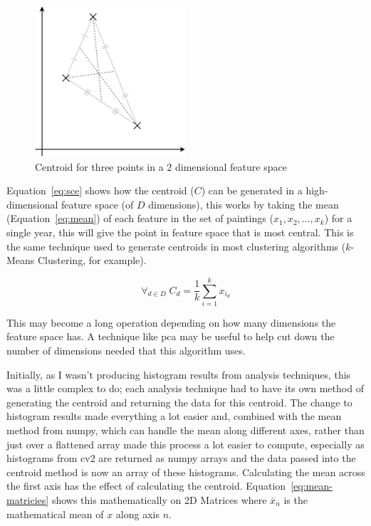 \begin{figure}[h]
\centering
\includegraphics[width=0.5\textwidth]{img/centroid.pdf}
\caption{Centroid for three points in a 2 dimensional feature space}\label{fig:centroid}
\end{figure}

Equation~\ref{eq:sce} shows how the centroid ($C$) can be generated in a high-dimensional feature 
space (of $D$ dimensions), this works by taking the mean (Equation~\ref{eq:mean}) of each feature 
in the set of paintings ($x_1, x_2,\dotsc,x_k$) for a single year, this will give the point in 
feature space that is most central. This is the same technique used to generate centroids in most 
clustering algorithms ($k$-Means Clustering, for example).

\begin{equation}
\label{eq:sce}
\forall_{d \in D}\;C_d = \frac{1}{k}\sum^{k}_{i=1}{x_{i_{d}}}
\end{equation}

This may become a long operation depending on how many dimensions the feature space has. A
technique like \gls{pca}\cite{Jolliffe2002Principal} may be useful to help cut down the number of dimensions needed that this
algorithm uses.

Initially, as I wasn't producing histogram results from analysis techniques, this was a little
complex to do; each analysis technique had to have its own method of generating the centroid and
returning the data for this centroid. The change to histogram results made everything a lot easier
and, combined with the mean method from numpy, which can handle the mean along 
different axes, rather than just over a flattened array made this process a lot easier to compute,
especially as histograms from \gls{cv2} are returned as numpy arrays and the data passed into the centroid method is now an 
array of these histograms. Calculating the mean across the first axis has the effect of 
calculating the centroid. Equation~\ref{eq:mean-matricies} shows this mathematically on 2D 
Matrices where $\bar{x}_n$ is the mathematical mean of $x$ along axis $n$.

